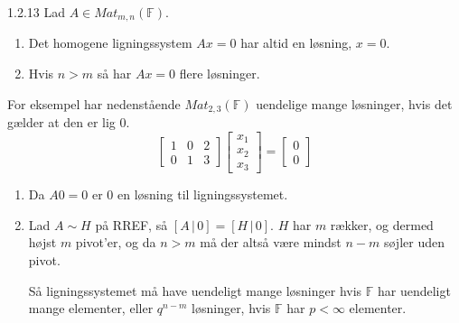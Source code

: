 \begin{korollar}{1.2.13}
	Lad $A \in Mat_{m,n}(\mathbb{F})$.
	\begin{enumerate}
		\item Det homogene ligningssystem $Ax = 0$ har altid en løsning, 
			$x = 0$.
		\item Hvis $n > m$ så har $Ax = 0$ flere løsninger.
	\end{enumerate}
\end{korollar}
For eksempel har nedenstående $Mat_{2,3}(\mathbb{F})$ uendelige mange 
løsninger, hvis det gælder at den er lig $0$.
\[ 
	\begin{bmatrix}
		1 & 0 & 2 \\
		0 & 1 & 3
	\end{bmatrix}
	\begin{bmatrix}
		x_1 \\ 
		x_2 \\
		x_3 
	\end{bmatrix}
	=
	\begin{bmatrix}
		0 \\ 
		0 
	\end{bmatrix}
\] 
\begin{bevis}
	\begin{enumerate}
		\item Da $A0 = 0$ er $0$ en løsning til ligningssystemet.
		\item Lad $A \sim H$ på RREF, så $[A\,|\,0] = [H\,|\,0]$. $H$ har $m$
			rækker, og dermed højst $m$ pivot'er, og da $n > m$ må der altså
			være mindst $n-m$ søjler uden pivot. 
			
			Så ligningssystemet må have
			uendeligt mange løsninger hvis $\mathbb{F}$ har uendeligt mange
			elementer, eller $q^{n-m}$ løsninger, hvis $\mathbb{F}$ har $p <
			\infty$ elementer.
	\end{enumerate}
\end{bevis}
